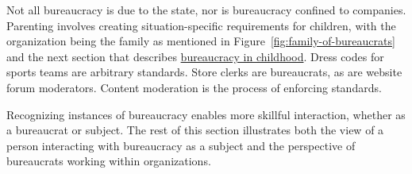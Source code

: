 Not all bureaucracy is due to the state, nor is bureaucracy confined to companies. Parenting involves creating situation-specific requirements for children, with the organization being the family as mentioned in Figure~\ref{fig:family-of-bureaucrats} and the next section 
that describes \hyperref[sec:bureaucracy-early-childhood]{bureaucracy in childhood}.
%
Dress codes for sports teams are arbitrary standards. 
Store clerks are bureaucrats, as are website forum moderators.  
Content moderation is the process of enforcing standards. 

Recognizing instances of bureaucracy enables more skillful interaction, whether as a bureaucrat or subject. The rest of this section illustrates both the view of a person interacting with bureaucracy as a \gls{subject} and the perspective of bureaucrats working within organizations. 




